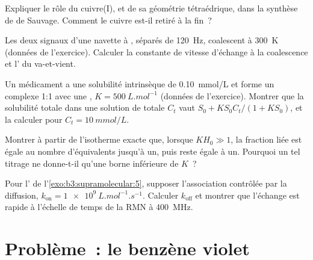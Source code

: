 \begin{exercise}[$\star\star$]\label{exo:b3:supramolecular:8}
Expliquer le rôle du cuivre(I), et de sa géométrie tétraédrique, dans la
synthèse de  de Sauvage. Comment le cuivre est-il retiré à la
fin~?
\end{exercise}

\begin{exercise}[$\star\star$]\label{exo:b3:supramolecular:9}
Les deux signaux d'une navette à , séparés de \qty{120}{Hz}, coalescent à \qty{300}{K} (données de
l'exercice). Calculer la constante de vitesse d'échange à la coalescence et
l' du va-et-vient.
\end{exercise}

\begin{exercise}[$\star\star\star$]\label{exo:b3:supramolecular:10}
Un médicament a une solubilité intrinsèque de \qty{0.10}{mmol/L} et forme un complexe 1:1 avec une
, $K = \qty{500}{L.mol^{-1}}$ (données de l'exercice). Montrer que la solubilité totale dans une
solution de  totale $C_t$ vaut $S_0 + KS_0C_t/(1 + KS_0)$, et la calculer pour $C_t = \qty{10}{mmol/L}$.
\end{exercise}

\begin{exercise}[$\star\star\star$]\label{exo:b3:supramolecular:11}
Montrer à partir de l'isotherme exacte que, lorsque $KH_0 \gg 1$, la fraction liée est égale au
nombre d'équivalents jusqu'à un, puis reste égale à un. Pourquoi un tel
titrage ne donne-t-il qu'une borne inférieure de $K$~?
\end{exercise}

\begin{exercise}[$\star\star\star$]\label{exo:b3:supramolecular:12}
Pour l' de l'\cref{exo:b3:supramolecular:5}, supposer l'association
contrôlée par la diffusion, $k_{\mathrm{on}} = \qty{1e9}{L.mol^{-1}.s^{-1}}$. Calculer $k_{\mathrm{off}}$ et montrer que l'échange est rapide à
l'échelle de temps de la RMN à \qty{400}{MHz}.
\end{exercise}

\section{Problème~: le benzène violet}

